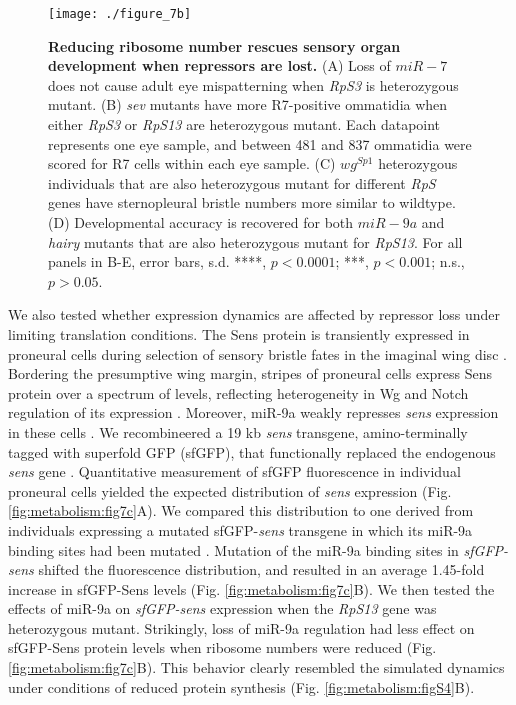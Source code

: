 \begin{figure}[h!]
\centering
\texttt{[image: ./figure\_7b]}
\caption[Reducing ribosome number rescues sensory organ development when repressors are lost.]{\textbf{Reducing ribosome number rescues sensory organ development when repressors are lost.} (A) Loss of $miR-7$ does not cause adult eye mispatterning when \textit{RpS3} is heterozygous mutant. (B) \textit{sev} mutants have more R7-positive ommatidia when either \textit{RpS3} or \textit{RpS13} are heterozygous mutant. Each datapoint represents one eye sample, and between 481 and 837 ommatidia were scored for R7 cells within each eye sample. (C) $wg^{Sp1}$ heterozygous individuals that are also heterozygous mutant for different \textit{RpS} genes have sternopleural bristle numbers more similar to wildtype. (D) Developmental accuracy is recovered for both $miR-9a$ and \textit{hairy} mutants that are also heterozygous mutant for \textit{RpS13}. For all panels in B-E, error bars, s.d. ****, $p<0.0001$; ***, $p<0.001$; n.s., $p>0.05$.}
\label{fig:metabolism:fig7b}
\end{figure}

We also tested whether expression dynamics are affected by repressor loss under limiting translation conditions. The Sens protein is transiently expressed in proneural cells during selection of sensory bristle fates in the imaginal wing disc \cite{Nolo2000}. Bordering the presumptive wing margin, stripes of proneural cells express Sens protein over a spectrum of levels, reflecting heterogeneity in Wg and Notch regulation of its expression \cite{JafarNejad2006,Quan2005}. Moreover, miR-9a weakly represses \textit{sens} expression in these cells \cite{Li2006}. We recombineered a 19 kb \textit{sens} transgene, amino-terminally tagged with superfold GFP (sfGFP), that functionally replaced the endogenous \textit{sens} gene \cite{Cassidy2013,Venken2006}. Quantitative measurement of sfGFP fluorescence in individual proneural cells yielded the expected distribution of \textit{sens} expression (Fig. \ref{fig:metabolism:fig7c}A). We compared this distribution to one derived from individuals expressing a mutated sfGFP-\textit{sens} transgene in which its miR-9a binding sites had been mutated \cite{Cassidy2013}. Mutation of the miR-9a binding sites in \textit{sfGFP-sens} shifted the fluorescence distribution, and resulted in an average 1.45-fold increase in sfGFP-Sens levels (Fig. \ref{fig:metabolism:fig7c}B). We then tested the effects of miR-9a on \textit{sfGFP-sens} expression when the \textit{RpS13} gene was heterozygous mutant. Strikingly, loss of miR-9a regulation had less effect on sfGFP-Sens protein levels when ribosome numbers were reduced (Fig. \ref{fig:metabolism:fig7c}B). This behavior clearly resembled the simulated dynamics under conditions of reduced protein synthesis (Fig. \ref{fig:metabolism:figS4}B).

